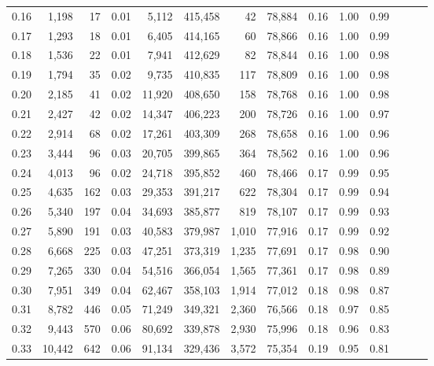 \begin{tabular}{rrrrrrrrrrrrrr}
0.16 &   1,198 &     17 &  0.01 &    5,112 &  415,458 &      42 &  78,884 &  0.16 &  1.00 &      0.99 \\
0.17 &   1,293 &     18 &  0.01 &    6,405 &  414,165 &      60 &  78,866 &  0.16 &  1.00 &      0.99 \\
0.18 &   1,536 &     22 &  0.01 &    7,941 &  412,629 &      82 &  78,844 &  0.16 &  1.00 &      0.98 \\
0.19 &   1,794 &     35 &  0.02 &    9,735 &  410,835 &     117 &  78,809 &  0.16 &  1.00 &      0.98 \\
0.20 &   2,185 &     41 &  0.02 &   11,920 &  408,650 &     158 &  78,768 &  0.16 &  1.00 &      0.98 \\
0.21 &   2,427 &     42 &  0.02 &   14,347 &  406,223 &     200 &  78,726 &  0.16 &  1.00 &      0.97 \\
0.22 &   2,914 &     68 &  0.02 &   17,261 &  403,309 &     268 &  78,658 &  0.16 &  1.00 &      0.96 \\
0.23 &   3,444 &     96 &  0.03 &   20,705 &  399,865 &     364 &  78,562 &  0.16 &  1.00 &      0.96 \\
0.24 &   4,013 &     96 &  0.02 &   24,718 &  395,852 &     460 &  78,466 &  0.17 &  0.99 &      0.95 \\
0.25 &   4,635 &    162 &  0.03 &   29,353 &  391,217 &     622 &  78,304 &  0.17 &  0.99 &      0.94 \\
0.26 &   5,340 &    197 &  0.04 &   34,693 &  385,877 &     819 &  78,107 &  0.17 &  0.99 &      0.93 \\
0.27 &   5,890 &    191 &  0.03 &   40,583 &  379,987 &   1,010 &  77,916 &  0.17 &  0.99 &      0.92 \\
0.28 &   6,668 &    225 &  0.03 &   47,251 &  373,319 &   1,235 &  77,691 &  0.17 &  0.98 &      0.90 \\
0.29 &   7,265 &    330 &  0.04 &   54,516 &  366,054 &   1,565 &  77,361 &  0.17 &  0.98 &      0.89 \\
0.30 &   7,951 &    349 &  0.04 &   62,467 &  358,103 &   1,914 &  77,012 &  0.18 &  0.98 &      0.87 \\
0.31 &   8,782 &    446 &  0.05 &   71,249 &  349,321 &   2,360 &  76,566 &  0.18 &  0.97 &      0.85 \\
0.32 &   9,443 &    570 &  0.06 &   80,692 &  339,878 &   2,930 &  75,996 &  0.18 &  0.96 &      0.83 \\
0.33 &  10,442 &    642 &  0.06 &   91,134 &  329,436 &   3,572 &  75,354 &  0.19 &  0.95 &      0.81 \\

\end{tabular}
